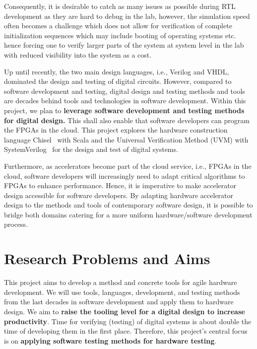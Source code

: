 \documentclass[fleqn,12pt]{article}
\newcommand{\note}[1]{{\it Note: #1}}
\begin{document}
Consequently, it is desirable to catch as many issues as possible during RTL development as they are hard to debug in the lab, however, the simulation speed often becomes a challenge which does not allow for verification of complete initialization sequences which may include booting of operating systems etc. hence forcing one to verify larger parts of the system at system level in the lab with reduced visibility into the system as a cost.

Up until recently, the two main design languages, i.e., Verilog and VHDL, dominated the
design and testing of digital circuits.
However, compared to software development and testing, digital design and testing methods
and tools are decades behind tools and technologies in software development.
Within this project, we plan to
{\bf leverage software development and testing methods for digital design.}
This shall also enable that software developers can program the FPGAs in the cloud.
This project explores the hardware construction language Chisel~\cite{chisel:dac2012} with Scala
and the Universal Verification Method (UVM) with SystemVerilog~\cite{SystemVerilog} for
the design and test of digital systems. 

Furthermore, as accelerators become part of the cloud service, i.e., FPGAs in the cloud,
software developers will increasingly need to adapt critical algorithms to FPGAs to enhance performance.
Hence, it is imperative to make accelerator design accessible for software developers.
By adapting hardware accelerator design to the methods and tools of contemporary software design,
it is possible to bridge both domains catering for a more uniform hardware/software development process.


\newpage
\section*{Research Problems and Aims}


This project aims to develop a method and concrete tools for agile hardware development.
We will use tools, languages, development, and testing methods from the last decades in
software development and apply them to hardware design.
We aim to {\bf raise the tooling level for a digital design to increase productivity}.
Time for verifying (testing) of digital systems is about double the time of developing
them in the first place.
Therefore, this project's central focus is on {\bf applying software
testing methods for hardware testing}.
\end{document}
